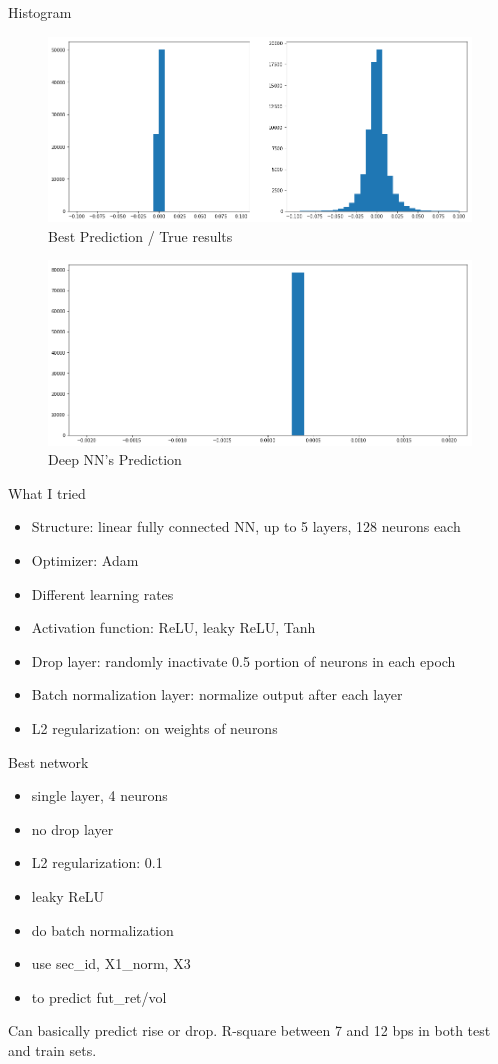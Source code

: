 \documentclass{beamer}
\begin{document}
\begin{frame}{Histogram}
    \begin{figure}[ht]
        \centering
        \includegraphics[width=0.7\linewidth,height=0.2\linewidth]{NN_1.png}
        \caption{Best Prediction / True results}
        \label{fig:label}
    \end{figure}
    
     \begin{figure}[ht]
        \centering
        \includegraphics[width=0.7\linewidth,height=0.2\linewidth]{NN_2.png}
        \caption{Deep NN's Prediction}
        \label{fig:label}
    \end{figure}
\end{frame}

\begin{frame}{What I tried}
    \begin{itemize}
        \item Structure: linear fully connected NN, up to 5 layers, 128 neurons each
        \item Optimizer: Adam
        \item Different learning rates
        \item Activation function: ReLU, leaky ReLU, Tanh
        \item Drop layer: randomly inactivate 0.5 portion of neurons in each epoch
        \item Batch normalization layer: normalize output after each layer
        \item L2 regularization: on weights of neurons
    \end{itemize}
\end{frame}

\begin{frame}{Best network}
\begin{itemize}
    \item single layer, 4 neurons
    \item no drop layer
    \item L2 regularization: 0.1
    \item leaky ReLU
    \item do batch normalization
    \item use sec\_id, X1\_norm, X3
    \item to predict fut\_ret/vol
\end{itemize}
    Can basically predict rise or drop. R-square between 7 and 12 bps in both test and train sets.
  
\end{frame}
\end{document}
